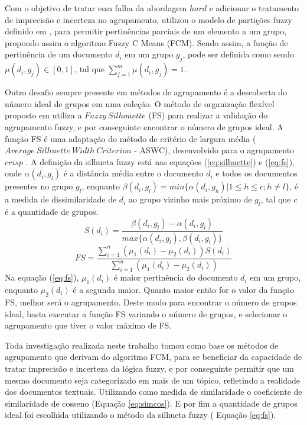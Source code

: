 Com o objetivo de tratar essa falha da abordagem $hard$ e adicionar o tratamento de imprecisão e
incerteza no agrupamento, \cite{Bezdek1984} utilizou o modelo de partições fuzzy definido em
\cite{Zadeh1965}, para permitir pertinências parciais de um elemento a um grupo, propondo assim o
algoritmo Fuzzy C Means (FCM).  Sendo assim, a função de pertinência de um documento $d_{i}$ em um
grupo $g_{j}$, pode ser definida como sendo $\mu(d_{i}, g_{j}) \in [0,1]$, tal que $\sum_{j=1}^m
\mu(d_{i}, g_{j}) = 1$.

Outro desafio sempre presente em métodos de agrupamento é a descoberta do número ideal de grupos em
uma coleção. O método de organização flexível proposto em \cite{Nogueira2013} utiliza a  $Fuzzy\
Silhouette$ (FS) para realizar a validação do agrupamento fuzzy, e por conseguinte encontrar o
número de grupos ideal. A função FS é uma adaptação do método de critério de largura média
($Average\ Silhuette\ Width\ Criterion$ - ASWC), desenvolvido para o agrupamento $crisp$
\cite{Nogueira2013}. A definição da silhueta fuzzy está nas equações (\ref{eq:silhuette}) e
(\ref{eq:fs}), onde $\alpha(d_i, g_l)$ é a distância média entre o documento $d_i$ e todos os
documentos presentes no grupo $g_l$, enquanto $\beta(d_i,g_l) = min\{\alpha(d_i,g_h) | 1 \leq h \leq
c; h \neq l\}$, é a medida de dissimilaridade de $d_i$ ao grupo vizinho mais próximo de $g_l$, tal
que $c$ é a quantidade de grupos.  \begin{equation} S(d_i) = \frac{\beta(d_i, g_l) -
\alpha(d_i,g_l)}{max\{\alpha(d_i,g_l), \beta(d_i,g_l)\}} \label{eq:silhuette} \end{equation}
\begin{equation} FS = \frac{\sum_{i=1}^n{(\mu_1(d_i) - \mu_2(d_i))}S(d_i)}{\sum_{i=1}^n{(\mu_1(d_i)
  - \mu_2(d_i))}} \label{eq:fs} \end{equation} Na equação (\ref{eq:fs}), $\mu_1(d_i)$ é maior
  pertinência do documento $d_i$ em um grupo, enquanto $\mu_2(d_i)$ é a segunda maior. Quanto maior
  então for o valor da função FS, melhor será o agrupamento. Deste modo para encontrar o número de
  grupos ideal, basta executar a função FS variando o número de grupos, e selecionar o agrupamento
  que tiver o valor máximo de FS.

Toda investigação realizada neste trabalho tomou como base os métodos de agrupamento que derivam do
algoritmo FCM\cite{Bezdek1984}, para se beneficiar da capacidade de tratar imprecisão e incerteza da
lógica fuzzy, e por conseguinte permitir que um mesmo documento seja categorizado em mais de um
tópico, refletindo a realidade dos documentos textuais. Utilizando como medida de similaridade o
coeficiente de similaridade de cosseno (Equação \ref{eq:simcos}). E por fim a quantidade de grupos
ideal foi escolhida utilizando o método da silhueta fuzzy ( Equação \ref{eq:fs}).

